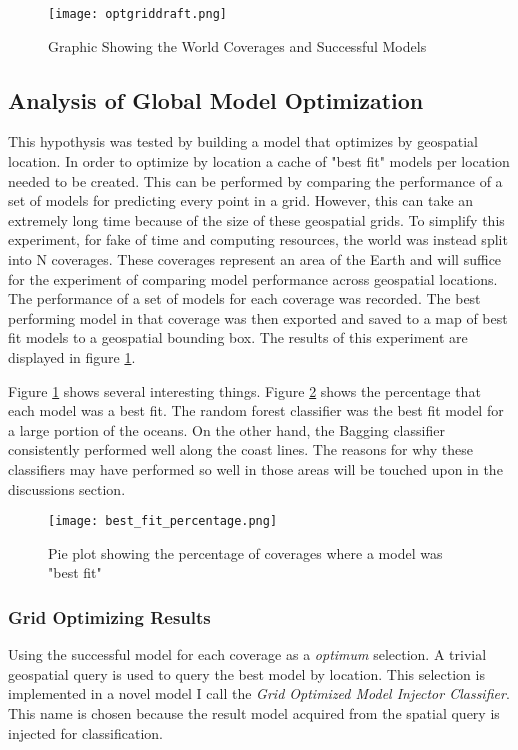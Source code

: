 \begin{figure}[h]
    \centering
    \texttt{[image: optgriddraft.png]}
    \caption{Graphic Showing the World Coverages and Successful Models}
    \label{fig:coveragegrid}
\end{figure}

\subsection{Analysis of Global Model Optimization}
This hypothysis was tested by building a model that optimizes by geospatial location.
In order to optimize by location a cache of "best fit" models per location needed to be created.
This can be performed by comparing the performance of a set of models for predicting every point in a grid.
However, this can take an extremely long time because of the size of these geospatial grids.
To simplify this experiment, for fake of time and computing resources, the world was instead split into N coverages.
These coverages represent an area of the Earth and will suffice for the experiment of comparing model performance across geospatial locations.
The performance of a set of models for each coverage was recorded.
The best performing model in that coverage was then exported and saved to a map of best fit models to a geospatial bounding box.
The results of this experiment are displayed in figure \ref{fig:coveragegrid}.

\par
Figure \ref{fig:coveragegrid} shows several interesting things.
Figure \ref{fig:pie_best_fit} shows the percentage that each model was a best fit.
The random forest classifier was the best fit model for a large portion of the oceans.
On the other hand, the Bagging classifier consistently performed well along the coast lines.
The reasons for why these classifiers may have performed so well in those areas will be touched upon in the discussions section.

\begin{figure}[h]
    \centering
    \texttt{[image: best\_fit\_percentage.png]}
    \caption{Pie plot showing the percentage of coverages where a model was "best fit"}
    \label{fig:pie_best_fit}
\end{figure}

\subsubsection{Grid Optimizing Results}
Using the successful model for each coverage as a \textit{optimum} selection.
A trivial geospatial query is used to query the best model by location.
This selection is implemented in a novel model I call the \textit{Grid Optimized Model Injector Classifier}.
This name is chosen because the result model acquired from the spatial query is injected for classification.

